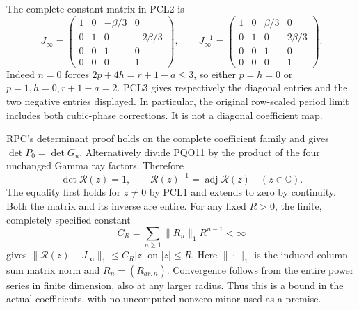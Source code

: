 The complete constant matrix in PCL2 is
\[
 J_\infty=
 \begin{pmatrix}
 1&0&-\beta/3&0\\
 0&1&0&-2\beta/3\\
 0&0&1&0\\
 0&0&0&1
 \end{pmatrix},\qquad
 J_\infty^{-1}=
 \begin{pmatrix}
 1&0&\beta/3&0\\
 0&1&0&2\beta/3\\
 0&0&1&0\\
 0&0&0&1
 \end{pmatrix}.
 \tag{PCL4}
\]
Indeed $n=0$ forces $2p+4h=r+1-a\le3$, so either $p=h=0$
or $p=1,h=0,r+1-a=2$. PCL3 gives respectively the diagonal
entries and the two negative entries displayed. In particular,
the original row-scaled period limit includes both cubic-phase
corrections. It is not a diagonal coefficient map.

RPC's determinant proof holds on the complete coefficient family
and gives $\det P_0=\det G_u$. Alternatively divide PQO11 by
the product of the four unchanged Gamma ray factors. Therefore
\[
       \det\mathcal R(z)=1,\qquad
       \mathcal R(z)^{-1}=\operatorname{adj}\mathcal R(z)
                       \quad(z\in\mathbb C).
 \tag{PCL5}
\]
The equality first holds for $z\ne0$ by PCL1 and extends to zero
by continuity. Both the matrix and its inverse are entire. For
any fixed $R>0$, the finite, completely specified constant
\[
 C_R=\sum_{n\ge1}\|R_n\|_1 R^{n-1}<\infty
 \tag{PCL6}
\]
gives $\|\mathcal R(z)-J_\infty\|_1\le C_R|z|$ on $|z|\le R$.
Here $\|\cdot\|_1$ is the induced column-sum matrix norm and
$R_n=(R_{a r,n})$. Convergence follows from the entire power
series in finite dimension, also at any larger radius. Thus
this is a bound in the actual coefficients, with no uncomputed
nonzero minor used as a premise.


